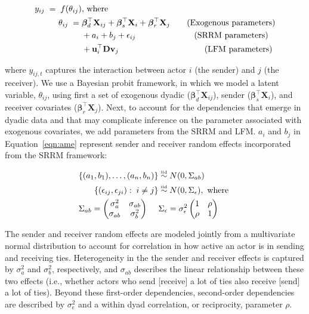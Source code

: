 \begin{align}
	\begin{aligned}
		y_{ij} \;=\; f(\theta_{ij}) &\text{, where } \\
		\theta_{ij} \;=\;& \bm\beta_{d}^{\top} \mathbf{X}_{ij} + \bm\beta_{s}^{\top} \mathbf{X}_{i} + \bm\beta_{r}^{\top} \mathbf{X}_{j} \text{\qquad(Exogenous parameters)} \\
		& + a_{i} + b_{j} + \epsilon_{ij} \text{\qquad\qquad\qquad\quad(SRRM parameters)} \\
		& + \mathbf{u}_{i}^{\top} \mathbf{D} \mathbf{v}_{j}  \text{\qquad\qquad\qquad\qquad\qquad\;(LFM parameters)} \\ 
	\label{eqn:ame}
	\end{aligned}
\end{align}

where $y_{ij,t}$ captures the interaction between actor $i$ (the sender) and $j$ (the receiver). We use a Bayesian probit framework, in which we model a latent variable, $\theta_{ij}$, using first a set of exogenous dyadic ($\bm\beta_{d}^{\top} \mathbf{X}_{ij}$), sender ($\bm\beta_{s}^{\top} \mathbf{X}_{i}$), and receiver covariates ($\bm\beta_{r}^{\top} \mathbf{X}_{j}$). Next, to account for the dependencies that emerge in dyadic data and that may complicate inference on the parameter associated with exogenous covariates, we add parameters from the SRRM and LFM. $a_{i}$ and $b_{j}$ in Equation~\ref{eqn:ame} represent sender and receiver random effects incorporated from the SRRM framework:

\begin{align}
	\begin{aligned}
		\{ (a_{1}, b_{1}), \ldots, (a_{n}, b_{n}) \} &\simiid N(0,\Sigma_{ab}) \\ 
		\{ (\epsilon_{ij}, \epsilon_{ji}) : \; i \neq j\} &\simiid N(0,\Sigma_{\epsilon}), \text{ where } \\
		\Sigma_{ab} = \begin{pmatrix} \sigma_{a}^{2} & \sigma_{ab} \\ \sigma_{ab} & \sigma_{b}^2   \end{pmatrix} \;\;\;\;\; &\Sigma_{\epsilon} = \sigma_{\epsilon}^{2} \begin{pmatrix} 1 & \rho \\ \rho & 1  \end{pmatrix}
	\label{eqn:srm}
	\end{aligned}
\end{align}

The sender and receiver random effects are modeled jointly from a multivariate normal distribution to account for correlation in how active an actor is in sending and receiving ties. Heterogeneity in the the sender and receiver effects is captured by $\sigma_{a}^{2}$ and $\sigma_{b}^{2}$, respectively, and $\sigma_{ab}$ describes the linear relationship between these two effects (i.e., whether actors who send [receive] a lot of ties also receive [send] a lot of ties). Beyond these first-order dependencies, second-order dependencies are described by $\sigma_{\epsilon}^{2}$ and a within dyad correlation, or reciprocity, parameter $\rho$. 

